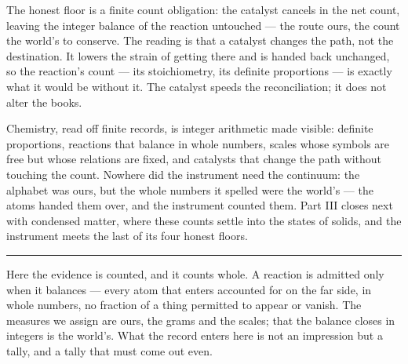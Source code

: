 The honest floor is a finite count obligation: the catalyst cancels in the net count, leaving the integer
balance of the reaction untouched --- the route ours, the count the world's to conserve. The reading is that a
catalyst changes the path, not the destination. It
lowers the strain of getting there and is handed back unchanged, so the reaction's count --- its
stoichiometry, its definite proportions --- is exactly what it would be without it. The catalyst speeds the
reconciliation; it does not alter the books.

\bigskip

Chemistry, read off finite records, is integer arithmetic made visible: definite proportions, reactions that
balance in whole numbers, scales whose symbols are free but whose relations are fixed, and catalysts that
change the path without touching the count. Nowhere did the instrument need the continuum: the alphabet was ours, but the whole numbers it spelled were
the world's --- the atoms handed them over, and the instrument counted them. Part III closes next with condensed matter, where these counts settle into
the states of solids, and the instrument meets the last of its four honest floors.

\bigskip
\begin{center}
\rule{0.4\textwidth}{0.4pt}
\end{center}
\bigskip

\noindent Here the evidence is counted, and it counts whole. A reaction is admitted only when it balances ---
every atom that enters accounted for on the far side, in whole numbers, no fraction of a thing permitted to
appear or vanish. The measures we assign are ours, the grams and the scales; that the balance closes in
integers is the world's. What the record enters here is not an impression but a tally, and a tally that must
come out even.

